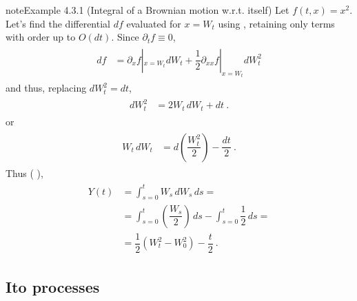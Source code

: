 \documentclass[letterpaper,10pt,english]{jupyterBook}
\begin{document}
\begin{sphinxadmonition}{note}{Example 4.3.1 (Integral of a Brownian motion w.r.t. itself)}
\sphinxAtStartPar
Let \(f(t,x) = x^2\). Let’s find the differential \(df\) evaluated for \(x = W_t\) using {\hyperref[\detokenize{ch/prob/processes-calculus:prob-processes-calculus-ito-lemma}]{}}, retaining only terms with order up to \(O(dt)\). Since \(\partial_t f \equiv 0\),
\begin{equation*}
\begin{split}\begin{aligned}
  df & = \partial_x f|_{x=W_t} dW_t + \dfrac{1}{2} \partial_{xx} f|_{x=W_t} dW_t^2 
\end{aligned}\end{split}
\end{equation*}
\sphinxAtStartPar
and thus, replacing \(dW_t^2 = dt\),
\begin{equation*}
\begin{split}\begin{aligned}
  d W_t^2 & =  2 W_t \, dW_t + dt \ .
\end{aligned}\end{split}
\end{equation*}
\sphinxAtStartPar
or
\begin{equation*}
\begin{split}\begin{aligned}
  W_t \, d W_t & = d \left( \dfrac{W_t^2}{2} \right) - \dfrac{dt}{2} \ .
\end{aligned}\end{split}
\end{equation*}
\sphinxAtStartPar
Thus ( ),
\begin{equation*}
\begin{split}\begin{aligned}
  Y(t)
  & = \int_{s=0}^t W_s \, dW_s \, ds = \\
  & = \int_{s=0}^t \left( \dfrac{W_s}{2} \right) \, ds - \int_{s=0}^t \dfrac{1}{2} \, ds = \\
  & = \dfrac{1}{2} \left( W_t^2 - W_0^2 \right) - \dfrac{t}{2} \ .
\end{aligned}\end{split}
\end{equation*}\end{sphinxadmonition}


\subsection{Ito processes}
\label{\detokenize{ch/prob/processes-calculus:ito-processes}}\label{\detokenize{ch/prob/processes-calculus:prob-processes-calculus-ito-process}}
\end{document}
